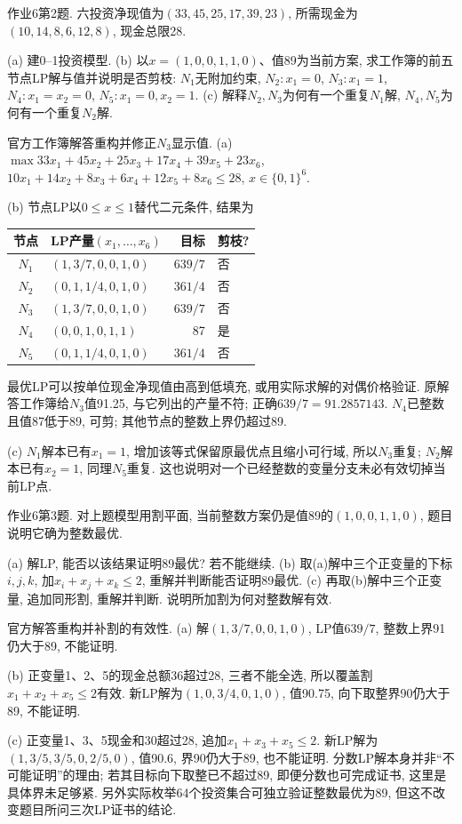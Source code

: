 \begin{exercise}\label{ass:15053-ps6-q2}
作业6第2题. 六投资净现值为$(33,45,25,17,39,23)$, 所需现金为$(10,14,8,6,12,8)$, 现金总限28.

(a) 建0--1投资模型. (b) 以$x=(1,0,0,1,1,0)$、值89为当前方案, 求工作簿的前五节点LP解与值并说明是否剪枝: $N_1$无附加约束, $N_2:x_1=0$, $N_3:x_1=1$, $N_4:x_1=x_2=0$, $N_5:x_1=0,x_2=1$. (c) 解释$N_2,N_3$为何有一个重复$N_1$解, $N_4,N_5$为何有一个重复$N_2$解.
\end{exercise}
\begin{solution}
官方工作簿解答重构并修正$N_3$显示值. (a) $\max33x_1+45x_2+25x_3+17x_4+39x_5+23x_6$, $10x_1+14x_2+8x_3+6x_4+12x_5+8x_6\le28$, $x\in\{0,1\}^6$.

(b) 节点LP以$0\le x\le1$替代二元条件, 结果为
\begin{center}\begin{tabular}{clrl}\toprule
节点&LP产量$(x_1,\ldots,x_6)$&目标&剪枝?\\\midrule
$N_1$&$(1,3/7,0,0,1,0)$&$639/7$&否\\
$N_2$&$(0,1,1/4,0,1,0)$&$361/4$&否\\
$N_3$&$(1,3/7,0,0,1,0)$&$639/7$&否\\
$N_4$&$(0,0,1,0,1,1)$&87&是\\
$N_5$&$(0,1,1/4,0,1,0)$&$361/4$&否\\\bottomrule
\end{tabular}\end{center}
最优LP可以按单位现金净现值由高到低填充, 或用实际求解的对偶价格验证. 原解答工作簿给$N_3$值91.25, 与它列出的产量不符; 正确$639/7=91.2857143$. $N_4$已整数且值87低于89, 可剪; 其他节点的整数上界仍超过89.

(c) $N_1$解本已有$x_1=1$, 增加该等式保留原最优点且缩小可行域, 所以$N_3$重复; $N_2$解本已有$x_2=1$, 同理$N_5$重复. 这也说明对一个已经整数的变量分支未必有效切掉当前LP点.
\end{solution}

\begin{exercise}\label{ass:15053-ps6-q3}
作业6第3题. 对上题模型用割平面, 当前整数方案仍是值89的$(1,0,0,1,1,0)$, 题目说明它确为整数最优.

(a) 解LP, 能否以该结果证明89最优? 若不能继续. (b) 取(a)解中三个正变量的下标$i,j,k$, 加$x_i+x_j+x_k\le2$, 重解并判断能否证明89最优. (c) 再取(b)解中三个正变量, 追加同形割, 重解并判断. 说明所加割为何对整数解有效.
\end{exercise}
\begin{solution}
官方解答重构并补割的有效性. (a) 解$(1,3/7,0,0,1,0)$, LP值$639/7$, 整数上界91仍大于89, 不能证明.

(b) 正变量1、2、5的现金总额36超过28, 三者不能全选, 所以覆盖割$x_1+x_2+x_5\le2$有效. 新LP解为$(1,0,3/4,0,1,0)$, 值90.75, 向下取整界90仍大于89, 不能证明.

(c) 正变量1、3、5现金和30超过28, 追加$x_1+x_3+x_5\le2$. 新LP解为$(1,3/5,3/5,0,2/5,0)$, 值90.6, 界90仍大于89, 也不能证明. 分数LP解本身并非“不可能证明”的理由; 若其目标向下取整已不超过89, 即便分数也可完成证书, 这里是具体界未足够紧. 另外实际枚举64个投资集合可独立验证整数最优为89, 但这不改变题目所问三次LP证书的结论.
\end{solution}

